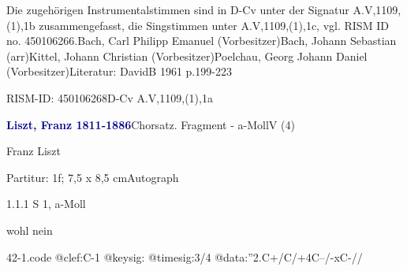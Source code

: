 \documentclass[a4paper, twocolumn, 11pt]{book}
\begin{document}
\newline %
\par Die zugehörigen Instrumentalstimmen sind in D-Cv unter der Signatur A.V,1109,(1),1b zusammengefasst, die Singstimmen unter A.V,1109,(1),1c, vgl. RISM ID no. 450106266.\newline Bach, Carl Philipp Emanuel  (Vorbesitzer)\newline Bach, Johann Sebastian  (arr)\newline Kittel, Johann Christian  (Vorbesitzer)\newline Poelchau, Georg Johann Daniel  (Vorbesitzer)\newline Literatur: DavidB 1961  p.199-223
\par RISM-ID: 450106268\newline D-Cv  A.V,1109,(1),1a
\par \vspace{16pt} \textcolor{darkblue}{\textbf{Liszt, Franz  1811-1886}}\hfillplus{[42]}\newline Chorsatz. Fragment - a-Moll\newline V (4)
\par \begin{itshape} Franz Liszt\end{itshape} 
\par \textcolor{darkblue}{}  Partitur: 1f; 7,5 x 8,5 cm\newline Autograph
\par 1.1.1  S 1, a-Moll\newline \begin{footnotesize} [...] wohl nein \end{footnotesize}  
\begin{filecontents*}{42-1.code}
@clef:C-1
@keysig:
@timesig:3/4
@data:''2.C+/C/+4C--/-xC-//
\end{filecontents*}
\end{document}
